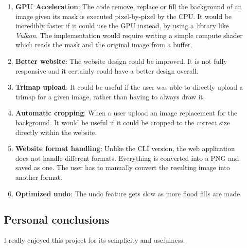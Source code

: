 \documentclass[a4paper]{article}
\begin{document}
\begin{enumerate}
    \item \textbf{GPU Acceleration}: The code remove, replace or fill the background
    of an image given its mask is executed pixel-by-pixel by the CPU.
    It would be incredibly faster if it could use the GPU instead, by using
    a library like \textit{Vulkan}. The implementation would require
    writing a simple compute shader which reads the mask and the original image
    from a buffer.
    \item \textbf{Better website}: The website design could be improved. It is not
    fully responsive and it certainly could have a better design overall.
    \item \textbf{Trimap upload}: It could be useful if the user was able to
    directly upload a \gls{trimap} for a given image, rather than having to always draw it.
    \item \textbf{Automatic cropping}: When a user upload an image replacement for the background.
    It would be useful if it could be cropped to the correct size directly within the website.
    \item \textbf{Website format handling}: Unlike the \gls{CLI} version, the web application does
    not handle different formats. Everything is converted into a \gls{PNG} and saved as one.
    The user has to manually convert the resulting image into another format.
    \item \textbf{Optimized undo}: The undo feature gets slow as more
    flood fills are made.
\end{enumerate}

\subsection{Personal conclusions}

I really enjoyed this project for its semplicity and usefulness.

\pagebreak

\listoffigures

\pagebreak

\nocite{*} %

\printbibliography

\pagebreak

\printnoidxglossary
\end{document}

